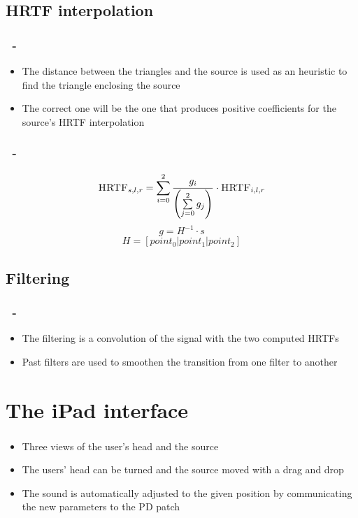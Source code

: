 \documentclass{beamer}
\begin{document}
	\subsection{\textsc{HRTF} interpolation}

	\begin{frame}
		\frametitle{\insertsection\ - \insertsubsection}
		\begin{itemize}
			\item The distance between the triangles and the source is used as an heuristic to find the triangle enclosing the source
			\item The correct one will be the one that produces positive coefficients for the source's \textsc{HRTF} interpolation
		\end{itemize}
	\end{frame}

	\begin{frame}
		\frametitle{\insertsection\ - \insertsubsection}
		$$ \textsc{HRTF}_{s,l,r} = \sum\limits_{i=0}^2 \dfrac{ g_i } { \left( \sum\limits_{j=0}^2 g_j \right) } \cdot \textsc{HRTF}_{i,l,r} $$
		$$ g = H^{-1} \cdot s $$
		$$ H = [ point_0 | point_1 | point_2 ] $$
	\end{frame}
	
	\subsection{Filtering}

	\begin{frame}
		\frametitle{\insertsection\ - \insertsubsection}
		\begin{itemize}
			\item The filtering is a convolution of the signal with the two computed \textsc{HRTF}s
			\item Past filters are used to smoothen the transition from one filter to another
		\end{itemize}
	\end{frame}

	\section{The iPad interface}

	\begin{frame}
		\frametitle{\insertsection}
		\begin{itemize}
			\item Three views of the user's head and the source
			\item The users' head can be turned and the source moved with a drag and drop
			\item The sound is automatically adjusted to the given position by communicating the
				new parameters to the PD patch
		\end{itemize}
	\end{frame}
\end{document}
